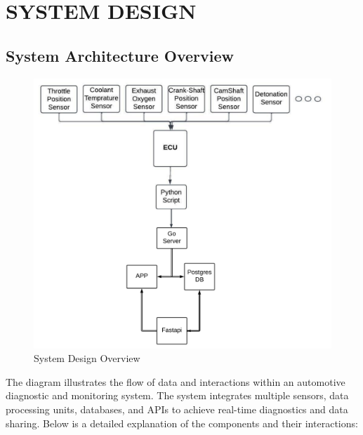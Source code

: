 \newpage
\chapter{SYSTEM DESIGN}

\justify
\section{System Architecture Overview} %

\begin{figure}[h!]
    \centering
    \includegraphics[width=15cm]{assets/system_design_adam.png}
    \caption{System Design Overview}
    \label{fig:system_design_overview}
\end{figure}

The diagram illustrates the flow of data and interactions within an automotive diagnostic and monitoring system. The system integrates multiple sensors, data processing units, databases, and APIs to achieve real-time diagnostics and data sharing. Below is a detailed explanation of the components and their interactions:

